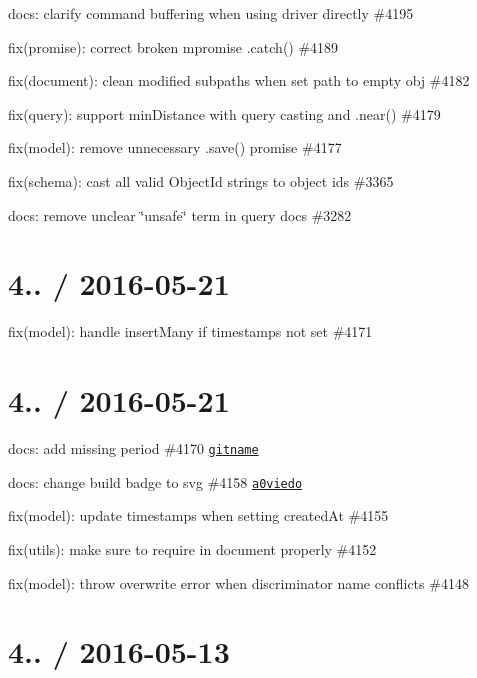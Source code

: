 \begin{DoxyItemize}
\item docs\+: clarify command buffering when using driver directly \#4195
\item fix(promise)\+: correct broken mpromise .catch() \#4189
\item fix(document)\+: clean modified subpaths when set path to empty obj \#4182
\item fix(query)\+: support min\+Distance with query casting and {\ttfamily .near()} \#4179
\item fix(model)\+: remove unnecessary .save() promise \#4177
\item fix(schema)\+: cast all valid Object\+Id strings to object ids \#3365
\item docs\+: remove unclear \char`\"{}unsafe\char`\"{} term in query docs \#3282
\end{DoxyItemize}

\section*{4.. / 2016-\/05-\/21 }


\begin{DoxyItemize}
\item fix(model)\+: handle insert\+Many if timestamps not set \#4171
\end{DoxyItemize}

\section*{4.. / 2016-\/05-\/21 }


\begin{DoxyItemize}
\item docs\+: add missing period \#4170 \href{https://github.com/gitname}{\tt gitname}
\item docs\+: change build badge to svg \#4158 \href{https://github.com/a0viedo}{\tt a0viedo}
\item fix(model)\+: update timestamps when setting {\ttfamily created\+At} \#4155
\item fix(utils)\+: make sure to require in document properly \#4152
\item fix(model)\+: throw overwrite error when discriminator name conflicts \#4148
\end{DoxyItemize}

\section*{4.. / 2016-\/05-\/13 }


